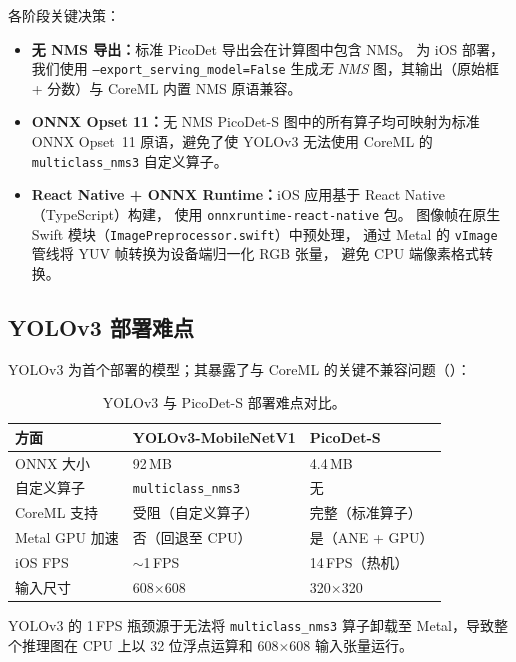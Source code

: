 各阶段关键决策：

\begin{itemize}[leftmargin=1.5em]
  \item \textbf{无 NMS 导出：}标准 PicoDet 导出会在计算图中包含 NMS。
    为 iOS 部署，我们使用 \texttt{--export\_serving\_model=False} 生成\emph{无 NMS} 图，其输出（原始框 + 分数）与 CoreML 内置 NMS 原语兼容。

  \item \textbf{ONNX Opset 11：}无 NMS PicoDet-S 图中的所有算子均可映射为标准 ONNX Opset~11 原语，避免了使 YOLOv3 无法使用 CoreML 的 \texttt{multiclass\_nms3} 自定义算子。

  \item \textbf{React Native + ONNX Runtime：}iOS 应用基于 React Native（TypeScript）构建，
    使用 \texttt{onnxruntime-react-native} 包。
    图像帧在原生 Swift 模块（\texttt{Image\-Preprocessor.swift}）中预处理，
    通过 Metal 的 \texttt{vImage} 管线将 YUV 帧转换为设备端归一化 RGB 张量，
    避免 CPU 端像素格式转换。
\end{itemize}

\subsection{YOLOv3 部署难点}

YOLOv3 为首个部署的模型；其暴露了与 CoreML 的关键不兼容问题（）：

\begin{table}[H]
\centering
\caption{YOLOv3 与 PicoDet-S 部署难点对比。}
\label{tab:deploy_compare}
\begin{tabular}{lll}
\toprule
\textbf{方面} & \textbf{YOLOv3-MobileNetV1} & \textbf{PicoDet-S} \\
\midrule
ONNX 大小     & 92\,MB  & 4.4\,MB \\
自定义算子   & \texttt{multiclass\_nms3} & 无 \\
CoreML 支持  & 受阻（自定义算子） & 完整（标准算子） \\
Metal GPU 加速 & 否（回退至 CPU） & 是（ANE + GPU） \\
iOS FPS      & $\sim$1\,FPS & 14\,FPS（热机） \\
输入尺寸     & 608$\times$608 & 320$\times$320 \\
\bottomrule
\end{tabular}
\end{table}

YOLOv3 的 1\,FPS 瓶颈源于无法将 \texttt{multiclass\_nms3} 算子卸载至 Metal，导致整个推理图在 CPU 上以 32 位浮点运算和 608$\times$608 输入张量运行。

